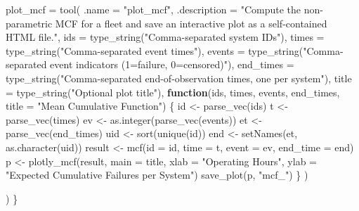 \documentclass[
  letterpaper,
  DIV=11,
  numbers=noendperiod]{scrreprt}
\newenvironment{Shaded}{\begin{snugshade}}{\end{snugshade}}
\newcommand{\AttributeTok}[1]{\textcolor[rgb]{0.40,0.45,0.13}{#1}}
\newcommand{\ControlFlowTok}[1]{\textcolor[rgb]{0.00,0.23,0.31}{\textbf{#1}}}
\newcommand{\FunctionTok}[1]{\textcolor[rgb]{0.28,0.35,0.67}{#1}}
\newcommand{\NormalTok}[1]{\textcolor[rgb]{0.00,0.23,0.31}{#1}}
\newcommand{\OtherTok}[1]{\textcolor[rgb]{0.00,0.23,0.31}{#1}}
\newcommand{\StringTok}[1]{\textcolor[rgb]{0.13,0.47,0.30}{#1}}
\begin{document}
\begin{Shaded}
\begin{Highlighting}[]
    \AttributeTok{plot\_mcf =} \FunctionTok{tool}\NormalTok{(}
      \AttributeTok{.name        =} \StringTok{"plot\_mcf"}\NormalTok{,}
      \AttributeTok{.description =} \StringTok{"Compute the non{-}parametric MCF for a fleet and save an interactive}
\StringTok{                      plot as a self{-}contained HTML file."}\NormalTok{,}
      \AttributeTok{ids       =} \FunctionTok{type\_string}\NormalTok{(}\StringTok{"Comma{-}separated system IDs"}\NormalTok{),}
      \AttributeTok{times     =} \FunctionTok{type\_string}\NormalTok{(}\StringTok{"Comma{-}separated event times"}\NormalTok{),}
      \AttributeTok{events    =} \FunctionTok{type\_string}\NormalTok{(}\StringTok{"Comma{-}separated event indicators (1=failure, 0=censored)"}\NormalTok{),}
      \AttributeTok{end\_times =} \FunctionTok{type\_string}\NormalTok{(}\StringTok{"Comma{-}separated end{-}of{-}observation times, one per system"}\NormalTok{),}
      \AttributeTok{title     =} \FunctionTok{type\_string}\NormalTok{(}\StringTok{"Optional plot title"}\NormalTok{),}
      \ControlFlowTok{function}\NormalTok{(ids, times, events, end\_times, }\AttributeTok{title =} \StringTok{"Mean Cumulative Function"}\NormalTok{) \{}
\NormalTok{        id  }\OtherTok{\textless{}{-}} \FunctionTok{parse\_vec}\NormalTok{(ids)}
\NormalTok{        t   }\OtherTok{\textless{}{-}} \FunctionTok{parse\_vec}\NormalTok{(times)}
\NormalTok{        ev  }\OtherTok{\textless{}{-}} \FunctionTok{as.integer}\NormalTok{(}\FunctionTok{parse\_vec}\NormalTok{(events))}
\NormalTok{        et  }\OtherTok{\textless{}{-}} \FunctionTok{parse\_vec}\NormalTok{(end\_times)}
\NormalTok{        uid }\OtherTok{\textless{}{-}} \FunctionTok{sort}\NormalTok{(}\FunctionTok{unique}\NormalTok{(id))}
\NormalTok{        end }\OtherTok{\textless{}{-}} \FunctionTok{setNames}\NormalTok{(et, }\FunctionTok{as.character}\NormalTok{(uid))}
\NormalTok{        result }\OtherTok{\textless{}{-}} \FunctionTok{mcf}\NormalTok{(}\AttributeTok{id =}\NormalTok{ id, }\AttributeTok{time =}\NormalTok{ t, }\AttributeTok{event =}\NormalTok{ ev, }\AttributeTok{end\_time =}\NormalTok{ end)}
\NormalTok{        p }\OtherTok{\textless{}{-}} \FunctionTok{plotly\_mcf}\NormalTok{(result, }\AttributeTok{main =}\NormalTok{ title,}
                        \AttributeTok{xlab =} \StringTok{"Operating Hours"}\NormalTok{,}
                        \AttributeTok{ylab =} \StringTok{"Expected Cumulative Failures per System"}\NormalTok{)}
        \FunctionTok{save\_plot}\NormalTok{(p, }\StringTok{"mcf\_"}\NormalTok{)}
\NormalTok{      \}}
\NormalTok{    )}

\NormalTok{  )}
\NormalTok{\}}
\end{Highlighting}
\end{Shaded}
\end{document}
